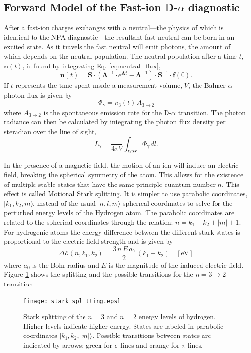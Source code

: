\subsection{Forward Model of the Fast-ion D-$\alpha$ diagnostic}
After a fast-ion charges exchanges with a neutral---the physics of which is identical to the NPA diagnostic---the resultant fast neutral can be born in an excited state. As it travels the fast neutral will emit photons, the amount of which depends on the neutral population.
The neutral population after a time $t$, $\mathbf{n}(t)$, is found by integrating Eq. \ref{eq:neutral_flux},
\begin{equation}\label{eq:neutral_population}
    \mathbf{n}(t) = \mathbf{S} \cdot ( \mathbf{\Lambda}^{-1} \cdot e^{\mathbf{\Lambda} t} - \mathbf{\Lambda}^{-1} ) \cdot \mathbf{S}^{-1} \cdot \mathbf{f}(0).
\end{equation}
If $t$ represents the time spent inside a measurement volume, $V$, the Balmer-$\alpha$ photon flux is given by
\begin{equation}\label{eq:photon_flux}
    \Phi_\gamma = n_{3}(t)\,A_{3 \rightarrow 2}
\end{equation}
where $A_{3\rightarrow2}$ is the spontaneous emission rate for the D-$\alpha$ transition.
The photon radiance can then be calculated by integrating the photon flux density per steradian over the line of sight,
\begin{equation}\label{eq:photon_radiance}
    L_\gamma = \frac{1}{4\pi V} \int_{LOS} \Phi_\gamma\, dl .
\end{equation}

In the presence of a magnetic field, the motion of an ion will induce an electric field, breaking the spherical symmetry of the atom.
This allows for the existence of multiple stable states that have the same principle quantum number $n$.
This effect is called Motional Stark splitting.
It is simpler to use parabolic coordinates, $|k_1,k_2,m\rangle$, instead of the usual $|n,l,m\rangle$ spherical coordinates to solve for the perturbed energy levels of the Hydrogen atom. The parabolic coordinates are related to the spherical coordinates through the relation: $n = k_1 + k_2 + |m| + 1$.
For hydrogenic atoms the energy difference between the different stark states is proportional to the electric field strength and is given by
\begin{equation}\label{eq:stark_splitting}
    \Delta \mathcal{E}(n,k_1,k_2) = \frac{3\,n\,E\,a_0}{2}\,(k_1 - k_2) \quad [\mathrm{eV}]
\end{equation}
where $a_0$ is the Bohr radius and $E$ is the magnitude of the induced electric field\cite{bethe&salpeter}. Figure \ref{fig:stark_splitting} shows the splitting and the possible transitions for the $n=3\rightarrow2$ transition.
\begin{figure}[ht]
    \centering
    \texttt{[image: stark\_splitting.eps]}
    \caption{Stark splitting of the $n=3$ and $n=2$ energy levels of hydrogen. Higher levels indicate higher energy. States are labeled in parabolic coordinates $|k_1,k_2,|m|\rangle$. Possible transitions between states are indicated by arrows: green for $\sigma$ lines and orange for $\pi$ lines.}
    \label{fig:stark_splitting}
\end{figure}

